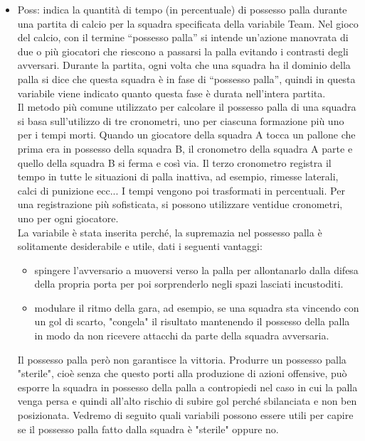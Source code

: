 \begin{itemize}
	
	\item \textsf{Poss}: indica la quantità di tempo (in percentuale) di possesso palla durante una partita di calcio per la squadra specificata della variabile \textsf{Team}. Nel gioco del calcio, con il termine “possesso palla” si intende un’azione manovrata di due o più giocatori che riescono a passarsi la palla evitando i contrasti degli avversari. Durante la partita, ogni volta che una squadra ha il dominio della palla si dice che questa squadra è in fase di “possesso palla”, quindi in questa variabile viene indicato quanto questa fase è durata nell'intera partita.\\
	Il metodo più comune utilizzato per calcolare il possesso palla di una squadra si basa sull'utilizzo di tre cronometri, uno per ciascuna formazione più uno per i tempi morti. Quando un giocatore della squadra A tocca un pallone che prima era in possesso della squadra B, il cronometro della squadra A parte e quello della squadra B si ferma e così via. Il terzo cronometro registra il tempo in tutte le situazioni di palla inattiva, ad esempio, rimesse laterali, calci di punizione ecc... I tempi vengono poi trasformati in percentuali. Per una registrazione più sofisticata, si possono utilizzare ventidue cronometri, uno per ogni giocatore.\\
	La variabile è stata inserita perché, la supremazia nel possesso palla è solitamente desiderabile e utile, dati i seguenti vantaggi:
	\begin{itemize}
		\item spingere l’avversario a muoversi verso la palla per allontanarlo dalla difesa della propria porta per poi sorprenderlo negli spazi lasciati incustoditi.   
		\item modulare il ritmo della gara, ad esempio, se una squadra sta vincendo con un gol di scarto, "congela" il risultato mantenendo il possesso della palla in modo da non ricevere attacchi da parte della squadra avversaria.
	\end{itemize}
	Il possesso palla però non garantisce la vittoria. Produrre un possesso palla "sterile", cioè senza che questo porti alla produzione di azioni offensive, può esporre la squadra in possesso della palla a contropiedi nel caso in cui la palla venga persa e quindi all'alto rischio di subire gol perché sbilanciata e non ben posizionata. Vedremo di seguito quali variabili possono essere utili per capire se il possesso palla fatto dalla squadra è "sterile" oppure no.
	

\end{itemize}
